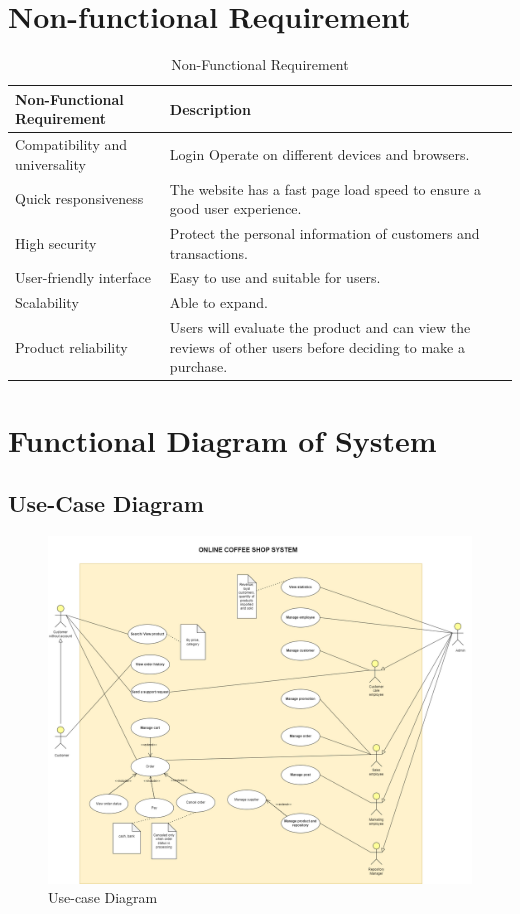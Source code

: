 \section{Non-functional Requirement}
\begin{table}[H]
\begin{tabular}{|>{\raggedright\arraybackslash}p{5cm}|>{\raggedright\arraybackslash}p{10cm}|}
\hline
\textbf{Non-Functional Requirement} & \textbf{Description} \\
\hline
Compatibility and universality& Login Operate on different devices and browsers.\\
\hline
Quick responsiveness&The website has a fast page load speed to ensure a good user experience.\\
\hline
High security &Protect the personal information of customers and transactions.\\
\hline
User-friendly  interface& Easy to use and suitable for users.\\
\hline
 Scalability& Able to expand.\\
\hline
Product reliability&Users will evaluate the product and can view the reviews of other users before deciding to make a purchase.\\
\hline
\end{tabular}
\caption{Non-Functional Requirement}
\label{tab:Non-Functional}
\end{table}


\section{Functional Diagram of System}
\subsection{Use-Case Diagram}

\begin{figure}[H]
  \centering
  \includegraphics[width=1.1\textwidth]{UseCase.png}
  \caption{Use-case Diagram}
  \label{fig:usecase}
\end{figure}
